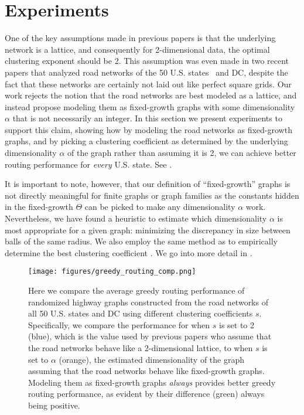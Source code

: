 \section{Experiments}

One of the key assumptions made in previous papers is that the underlying
network is a lattice, and consequently for 2-dimensional data, the optimal
clustering exponent should be 2.
This assumption was even made in two recent papers that analyzed road networks
of the 50 U.S. states~\cite{goodrich2022modeling,gila2023highway} and DC, despite the
fact that these networks are certainly not laid out like perfect square grids.
Our work rejects the notion that the road networks are best modeled as a
lattice, and instead propose modeling them as fixed-growth graphs with some
dimensionality $\alpha$ that is not necessarily an integer.
In this section we present experiments to support this claim, showing how by
modeling the road networks as fixed-growth graphs, and by picking a clustering
coefficient as determined by the underlying dimensionality $\alpha$ of the graph
rather than assuming it is 2, we can achieve better routing performance for
\textit{every} U.S. state.
See .

It is important to note, however, that our definition of ``fixed-growth'' graphs
is not directly meaningful for finite graphs or graph families as the constants
hidden in the fixed-growth $\Theta$ can be picked to make any dimensionality
$\alpha$ work.
Nevertheless, we have found a heuristic to estimate
which dimensionality $\alpha$ is most appropriate for a given graph: 
minimizing the discrepancy in size between balls of the same radius. 
We also employ the same method as \cite{goodrich2022modeling} to 
empirically determine the best clustering coefficient%
.
We go into more detail in .

\begin{figure}[t]
	\centering
	\texttt{[image: figures/greedy\_routing\_comp.png]}
	\vspace*{-\bigskipamount}
	\vspace*{-\medskipamount}
	\caption{
		Here we compare the average greedy routing performance of randomized
		highway graphs constructed from the road networks of all 50 U.S. states
		and DC using different clustering coefficients $s$.
		Specifically, we compare the performance for when $s$ is set to 2
		(blue), which is the value used by previous papers who assume that the
		road networks behave like a 2-dimensional lattice, to when $s$ is set to
		$\alpha$ (orange), the estimated dimensionality of the graph assuming
		that the road networks behave like fixed-growth graphs.
		Modeling them as fixed-growth graphs \textit{always} provides better
		greedy routing performance, as evident by their difference (green)
		always being positive.
		\label{fig:greedy_routing_comp}
	}
	\vspace*{-\medskipamount}
\end{figure}

